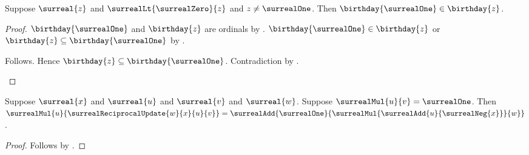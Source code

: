 \begin{lemma}\label{surreal_one_birthday_before_positive_nonunit}
    Suppose $\surreal{z}$ and $\surrealLt{\surrealZero}{z}$ and
        $z\neq\surrealOne$.
    Then $\birthday{\surrealOne}\in\birthday{z}$.
\end{lemma}
\begin{proof}
    $\birthday{\surrealOne}$ and $\birthday{z}$ are ordinals
        by .
    $\birthday{\surrealOne}\in\birthday{z}$ or
        $\birthday{z}\subseteq\birthday{\surrealOne}$
        by .
    \begin{byCase}
            Follows.
            Hence $\birthday{z}\subseteq\birthday{\surrealOne}$.
            Contradiction by
                .
    \end{byCase}
\end{proof}

\begin{lemma}\label{surreal_reciprocal_update_multiplied}
    Suppose $\surreal{x}$ and $\surreal{u}$ and $\surreal{v}$ and
        $\surreal{w}$.
    Suppose $\surrealMul{u}{v}=\surrealOne$.
    Then
        $\surrealMul{u}{\surrealReciprocalUpdate{w}{x}{u}{v}}
        =\surrealAdd{\surrealOne}{
            \surrealMul{\surrealAdd{u}{\surrealNeg{x}}}{w}}$.
\end{lemma}
\begin{proof}
    Follows by
        .
\end{proof}


